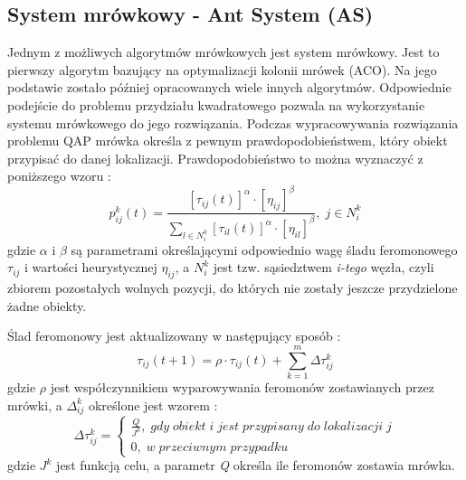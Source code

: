\subsection{System mrówkowy - Ant System (AS)}
Jednym z możliwych algorytmów mrówkowych jest system mrówkowy. Jest to pierwszy algorytm bazujący
na optymalizacji kolonii mrówek (ACO). Na jego podstawie zostało później opracowanych wiele innych algorytmów. Odpowiednie podejście do problemu przydziału kwadratowego pozwala na wykorzystanie systemu mrówkowego do jego rozwiązania. Podczas wypracowywania rozwiązania problemu QAP mrówka określa z pewnym prawdopodobieństwem, który obiekt przypisać do danej lokalizacji. Prawdopodobieństwo to można wyznaczyć z poniższego wzoru \cite{FILIP_STADNE}:
\newline
\begin{equation}
p_{ij}^k(t)=\frac{[\tau_{ij}(t)]^\alpha\cdot[\eta_{ij}]^\beta}{\sum\limits_{l\in N_i^k} [\tau_{il}(t)]^\alpha\cdot[\eta_{il}]^\beta}, \; j \in N_i^k
\end{equation}
\newline
gdzie $\alpha$ i $\beta$ są parametrami  określającymi odpowiednio wagę śladu feromonowego $\tau_{ij}$ i wartości heurystycznej $\eta_{ij}$, a $N_i^k$ jest tzw. sąsiedztwem \textit{i-tego} węzła, czyli zbiorem pozostałych wolnych pozycji, do których nie zostały jeszcze przydzielone żadne obiekty.

Ślad feromonowy jest aktualizowany w następujący sposób \cite{FILIP_STADNE}:
\newline
\begin{equation}
\tau_{ij}(t+1)= \rho \cdot \tau_{ij}(t)+\sum\limits_{k=1}^m \Delta \tau_{ij}^k
\end{equation}
\newline
gdzie $\rho$ jest współczynnikiem wyparowywania feromonów zostawianych przez mrówki, a $\Delta_{ij}^k$ określone jest wzorem \cite{FILIP_STADNE}:
\newline
\begin{equation}
\Delta \tau_{ij}^k = \left\{ \begin{array}{ccc} \frac{Q}{J^k}, \; gdy \; obiekt \; i \; jest \; przypisany \; do \; lokalizacji \; j \\ 0, \; w \; przeciwnym \;  przypadku \end{array} \right.
\end{equation}
\newline
gdzie $J^k$ jest funkcją celu, a parametr \textit{Q} określa ile feromonów zostawia mrówka.

